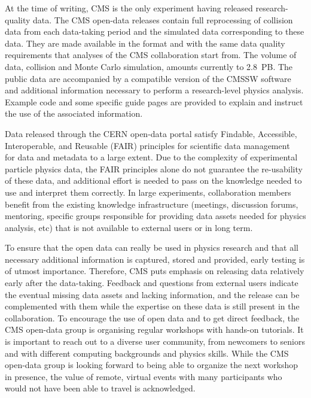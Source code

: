 \documentclass[11pt]{article}
\begin{document}
At the time of writing, CMS is the only experiment having released research-quality data. The CMS open-data releases contain full reprocessing of collision data from each data-taking period and the simulated data corresponding to these data. They are made available in the format and with the same data quality requirements that analyses of the CMS collaboration start from. The volume of data, collision and Monte Carlo simulation, amounts currently to 2.8~PB. The public data are accompanied by a compatible version of the CMSSW software and additional information necessary to perform a research-level physics analysis. Example code and some specific guide pages are provided to explain and instruct the use of the associated information.

Data released through the CERN open-data portal satisfy Findable, Accessible, Interoperable, and Reusable (FAIR) principles for scientific data management~\cite{FAIR-paper} for data and metadata to a large extent. Due to the complexity of experimental particle physics data, the FAIR principles alone do not guarantee the re-usability of these data, and additional effort is needed to pass on the knowledge needed to use and interpret them correctly. In large experiments, collaboration members benefit from the existing knowledge infrastructure (meetings, discussion forums, mentoring, specific groups responsible for providing data assets needed for physics analysis, etc) that is not available to external users or in long term. 


To ensure that the open data can really be used in physics research and that all necessary additional information is captured, stored and provided, early testing is of utmost importance. Therefore, CMS puts emphasis on releasing data relatively early after the data-taking. Feedback and questions from external users indicate the eventual missing data assets and lacking information, and the release can be complemented with them while the expertise on these data is still present in the collaboration. To encourage the use of open data and to get direct feedback, the CMS open-data group is organising regular workshops with hands-on tutorials. It is important to reach out to a diverse user community, from newcomers to seniors and with different computing backgrounds and physics skills. While the CMS open-data group is looking forward to being able to organize the next workshop in presence, the value of remote, virtual events with many participants who would not have been able to travel is acknowledged.
\end{document}
